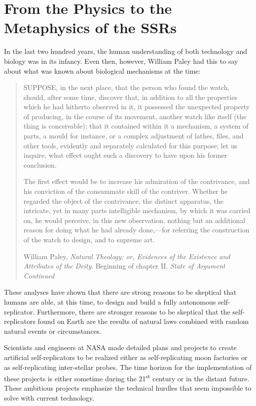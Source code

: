 \section[From the Physics to the Metaphysics]{From the Physics to the Metaphysics of the SSRs}

In the last two hundred years, the human understanding of both technology and
biology was in its infancy.  Even then, however, William Paley had this
to say about what was known about biological mechanisms at the time:

\begin{quote}
SUPPOSE, in the next place, that the person who found the
watch, should, after some time, discover that, in addition to all the
properties which he had hitherto observed in it, it possessed the
unexpected property of producing, in the course of its movement,
another watch like itself (the thing is conceivable); that it contained
within it a mechanism, a system of parts, a mould for instance, or a
complex adjustment of lathes, files, and other tools, evidently and
separately calculated for this purpose; let us inquire, what effect
ought such a discovery to have upon his former conclusion.

The first effect would be to increase his admiration of the
contrivance, and his conviction of the consummate skill of the
contriver. Whether he regarded the object of the contrivance, the
distinct apparatus, the intricate, yet in many parts intelligible
mechanism, by which it was carried on, he would perceive, in this new
observation, nothing but an additional reason for doing what he had
already done,---for referring the construction of the watch to design,
and to supreme art.

William Paley, \textit{Natural Theology: or, Evidences of the Existence
and Attributes of the Deity}. Beginning of chapter II. \textit{State of
Argument Continued}%
\end{quote}

These analyses have shown that there are strong reasons to be skeptical that
humans are able, at this time, to design and build a fully autonomous
self-replicator. Furthermore, there are stronger reasons to be skeptical that
the self-replicators found on Earth are the results of
natural laws combined with random natural events or circumstances.

Scientists and engineers at NASA made
detailed plans and projects to create artificial self-replicators to
be realized either as self-replicating moon factories or as
self-replicating inter-stellar probes.  The time horizon for the
implementation of these projects is either sometime during the
21\textsuperscript{st} century or in the distant future. 
These ambitious projects emphasize the technical hurdles that seem impossible to solve with current technology.

